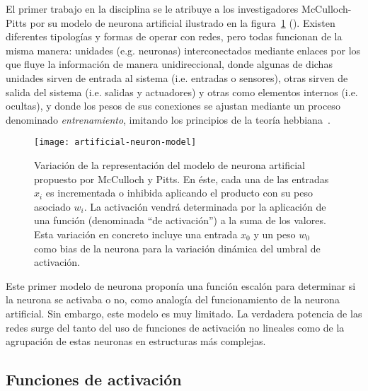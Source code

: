 El primer trabajo en la disciplina se le atribuye a  los investigadores McCulloch-Pitts por su modelo de neurona artificial ilustrado en la figura~\ref{fig:mccullocs-pitts-neuron-model} (\cite{McCulloch1943}). Existen diferentes tipologías y formas de operar con redes, pero todas funcionan de la misma manera: unidades (e.g. neuronas) interconectados mediante enlaces por los que fluye la información de manera unidireccional, donde algunas de dichas unidades sirven de entrada al sistema (i.e. entradas o sensores), otras sirven de salida del sistema (i.e. salidas y actuadores) y otras como elementos internos (i.e. ocultas), y donde los pesos de sus conexiones se ajustan mediante un proceso denominado \textit{entrenamiento}, imitando los principios de la teoría hebbiana~\cite{hebb19680}.

\begin{figure}[!b]
	\centering
	\texttt{[image: artificial-neuron-model]}
	\caption[Modelo de neurona artificial de McCulloch y Pitts]{Variación de la representación del modelo de neurona artificial propuesto por McCulloch y Pitts. En éste, cada una de las entradas $x_i$ es incrementada o inhibida aplicando el producto con su peso asociado $w_i$. La activación vendrá determinada por la aplicación de una función (denominada \enquote{de activación}) a la suma de los valores. Esta variación en concreto incluye una entrada $x_0$ y un peso $w_0$ como bias de la neurona para la variación dinámica del umbral de activación.}
	\label{fig:mccullocs-pitts-neuron-model}
\end{figure}

Este primer modelo de neurona proponía una función escalón para determinar si la neurona se activaba o no, como analogía del funcionamiento de la neurona artificial. Sin embargo, este modelo es muy limitado. La verdadera potencia de las redes surge del tanto del uso de funciones de activación no lineales como de la agrupación de estas neuronas en estructuras más complejas.

\subsection{Funciones de activación}

